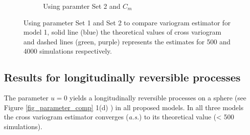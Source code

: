 \begin{figure}[H]
\begin{subfigure}{.5\textwidth}
		\caption{Using paramter Set 2 and $C_m$}
		\label{fig:sfig2}
	\end{subfigure}
	\caption[Cross variogram estimator comparison]{Using parameter Set 1 and Set 2 to compare variogram estimator for model 1, solid line (blue) the theoretical values of cross variogram and dashed lines (green, purple) represents the estimates for 500 and 4000 simulations respectively. }
	\label{compare_varigram_sim_1}
\end{figure}


% 



\subsection{\bf Results for longitudinally reversible processes}

The parameter $u = 0$ yields a longitudinally reversible processes on a sphere (see Figure \ref{fig_parameter_comp} 1(d) ) in all proposed models. In all three models the cross variogram estimator converges ({\em a.s.}) to its theoretical value (< 500 simulations).          

